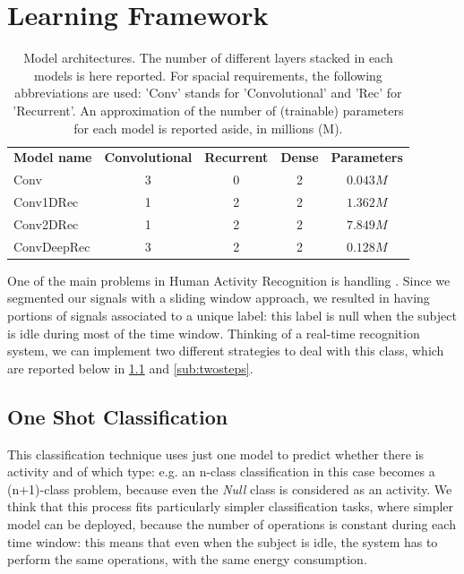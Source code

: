 \section{Learning Framework}
\label{sec:learning_framework}

\begin{table}[]
	\begin{tabular}{lcccc}
		\textbf{Model name} & \textbf{Convolutional} & \textbf{Recurrent} & \textbf{Dense} & \textbf{Parameters}	\\
		Conv		& 3 & 0 & 2	& $0.043 M$		\\
		Conv1DRec	& 1	& 2	& 2	& $1.362 M$			\\
		Conv2DRec	& 1	& 2	& 2	& $7.849 M$			\\
		ConvDeepRec	& 3	& 2	& 2	& $0.128 M$			\\
	\end{tabular}
	\caption{Model architectures. The number of different layers stacked in each models is here reported. For spacial requirements, the following abbreviations are used: 'Conv' stands for 'Convolutional' and 'Rec' for 'Recurrent'. An approximation of the number of (trainable) parameters for each model is reported aside, in millions (M).}
	\label{tab:models}
\end{table}

One of the main problems in Human Activity Recognition is handling . Since we segmented our signals with a sliding window approach, we resulted in having portions of signals associated to a unique label: this label is null when the subject is idle during most of the time window. Thinking of a real-time recognition system, we can implement two different strategies to deal with this class, which are reported below in \ref{sub:oneshot} and \ref{sub:twosteps}.

\subsection{One Shot Classification}
\label{sub:oneshot}

This classification technique uses just one model to predict whether there is activity and of which type: e.g. an n-class classification in this case becomes a (n+1)-class problem, because even the \textit{Null} class is considered as an activity. We think that this process fits particularly simpler classification tasks, where simpler model can be deployed, because the number of operations is constant during each time window: this means that even when the subject is idle, the system has to perform the same operations, with the same energy consumption.

